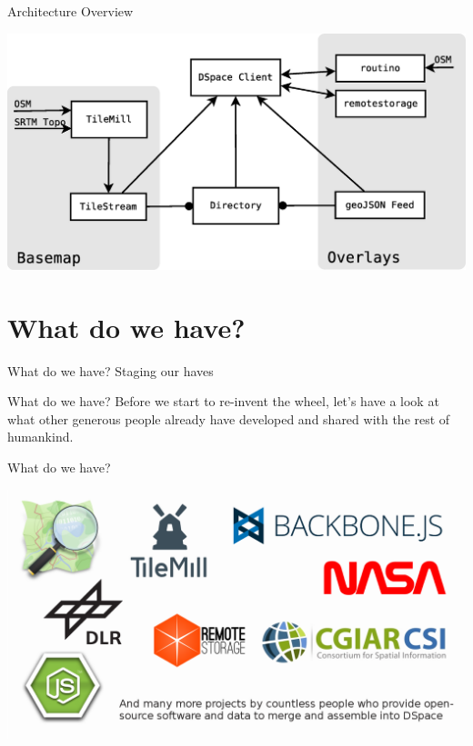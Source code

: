 \documentclass{beamer}
\begin{document}
\begin{frame}{Architecture Overview}
 \begin{center}
  \includegraphics[scale=0.35]{images/architecture.eps}
 \end{center}
\end{frame}



\section{What do we have?}

\begin{frame}{What do we have?}
 Staging our haves
\end{frame}

\begin{frame}{What do we have?}
 Before we start to re-invent the wheel, let's have a look at what other
 generous people already have developed and shared with the rest of humankind.
\end{frame}

\begin{frame}{What do we have?}
 \begin{center}
  \vspace{0.8em}
  \includegraphics[scale=0.281]{images/logos}
 \end{center}
\end{frame}
\end{document}
